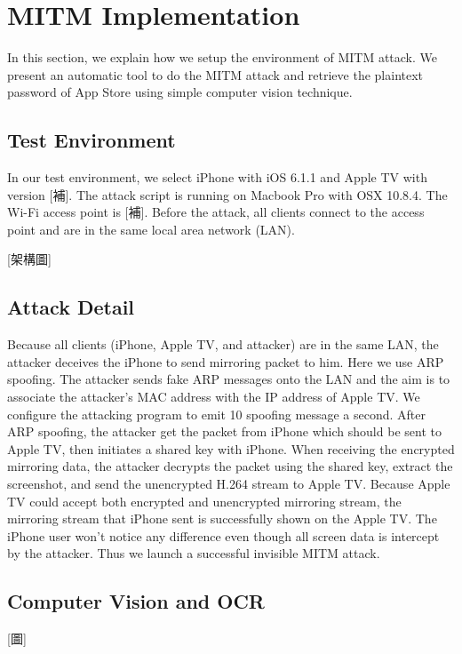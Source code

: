 \chapter{MITM Implementation}

In this section, we explain how we setup the environment of MITM attack. We present an automatic tool to do the MITM attack and retrieve the plaintext password of App Store using simple computer vision technique.

\section{Test Environment}

In our test environment, we select iPhone with iOS 6.1.1 and Apple TV with version [補]. The attack script is running on Macbook Pro with OSX 10.8.4. The Wi-Fi access point is [補]. Before the attack, all clients connect to the access point and are in the same local area network (LAN).

[架構圖]

\section{Attack Detail}

Because all clients (iPhone, Apple TV, and attacker) are in the same LAN, the attacker deceives the iPhone to send mirroring packet to him. Here we use ARP spoofing. The attacker sends fake ARP messages onto the LAN and the aim is to associate the attacker's MAC address with the IP address of Apple TV. We configure the attacking program to emit 10 spoofing message a second. After ARP spoofing, the attacker get the packet from iPhone which should be sent to Apple TV, then initiates a shared key with iPhone. When receiving the encrypted mirroring data, the attacker decrypts the packet using the shared key, extract the screenshot, and send the unencrypted H.264 stream to Apple TV. Because Apple TV could accept both encrypted and unencrypted mirroring stream, the mirroring stream that iPhone sent is successfully shown on the Apple TV. The iPhone user won't notice any difference even though all screen data is intercept by the attacker. Thus we launch a successful invisible MITM attack.

\section{Computer Vision and OCR}

[圖]

